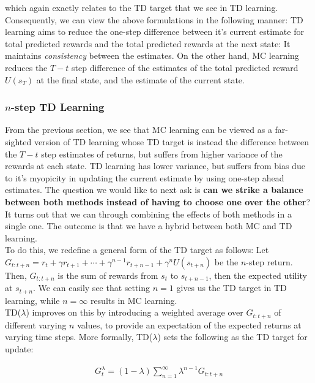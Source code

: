 \documentclass[11pt]{article}
\begin{document}
which again exactly relates to the TD target that we see in TD learning. Consequently, we can view the above formulations in the following manner: TD learning aims to reduce the one-step difference between it's current estimate for total predicted rewards and the total predicted rewards at the next state: It maintains \textit{consistency} between the estimates. On the other hand, MC learning reduces the $T-t$ step difference of the estimates of the total predicted reward $U(s_T)$ at the final state, and the estimate of the current state.

\subsubsection{$n$-step TD Learning}

From the previous section, we see that MC learning can be viewed as a far-sighted version of TD learning whose TD target is instead the difference between the $T-t$ step estimates of returns, but suffers from higher variance of the rewards at each state. TD learning has lower variance, but suffers from bias due to it's myopicity in updating the current estimate by using one-step ahead estimates. The question we would like to next ask is \textbf{can we strike a balance between both methods instead of having to choose one over the other}? It turns out that we can through combining the effects of both methods in a single one. The outcome is that we have a hybrid between both MC and TD learning.\\

To do this, we redefine a general form of the TD target as follows: Let $G_{t:t+n} = r_t + \gamma r_{t+1} + \cdots + \gamma^{n-1} r_{t+n-1} + \gamma^n U(s_{t+n})$ be the $n$-step return. Then, $G_{t:t+n}$ is the sum of rewards from $s_t$ to $s_{t+n-1}$, then the expected utility at $s_{t+n}$. We can easily see that setting $n=1$ gives us the TD target in TD learning, while $n=\infty$ results in MC learning.\\

TD($\lambda$) improves on this by introducing a weighted average over $G_{t:t+n}$ of different varying $n$ values, to provide an expectation of the expected returns at varying time steps. More formally, TD($\lambda$) sets the following as the TD target for update:

$$
\begin{aligned}
G^{\lambda}_t = (1-\lambda)\sum^{\infty}_{n=1} \lambda^{n-1} G_{t:t+n} 
\end{aligned}
$$
\end{document}
